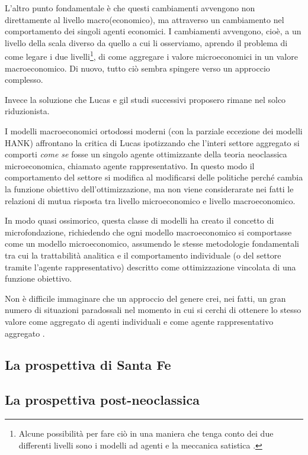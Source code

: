 \documentclass[a4paper, headings=standardclasses]{scrartcl}
\begin{document}
L'altro punto fondamentale è che questi cambiamenti avvengono non direttamente al livello macro(economico), ma attraverso un cambiamento nel comportamento dei singoli agenti economici. I cambiamenti avvengono, cioè, a un livello della scala diverso da quello a cui li osserviamo, aprendo il problema di come legare i due livelli\footnote{Alcune possibilità per fare ciò in una maniera che tenga conto dei due differenti livelli sono i modelli ad agenti \parencite{dosi2019} e la meccanica satistica \parencite{foley1994}.}, di come aggregare i valore microeconomici in un valore macroeconomico.
Di nuovo, tutto ciò sembra spingere verso un approccio complesso.

Invece la soluzione che Lucas e gil studi successivi proposero rimane nel solco riduzionista.

I modelli macroeconomici ortodossi moderni (con la parziale eccezione dei modelli HANK) affrontano la critica di Lucas ipotizzando che l'interi settore aggregato si comporti \textit{come se} fosse un singolo agente ottimizzante della teoria neoclassica microeconomica, chiamato agente rappresentativo.
In questo modo il comportamento del settore si modifica al modificarsi delle politiche perché cambia la funzione obiettivo dell'ottimizzazione, ma non viene considerarate nei fatti le relazioni di mutua risposta tra livello microeconomico e livello macroeconomico.

In modo quasi ossimorico, questa classe di modelli ha creato il concetto di microfondazione, richiedendo che ogni modello macroeconomico si comportasse come un modello microeconomico, assumendo le stesse metodologie fondamentali tra cui la trattabilità analitica e il comportamento individuale (o del settore tramite l'agente rappresentativo) descritto come ottimizzazione vincolata di una funzione obiettivo.

Non è difficile immaginare che un approccio del genere crei, nei fatti, un gran numero di situazioni paradossali nel momento in cui si cerchi di ottenere lo stesso valore come aggregato di agenti individuali e come agente rappresentativo aggregato \parencite{kirman1992}.

\subsection{La prospettiva di Santa Fe}

\subsection{La prospettiva post-neoclassica}
\end{document}
